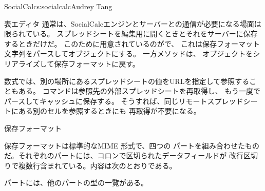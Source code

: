 \begin{aosachapter}{SocialCalc}{s:socialcalc}{Audrey Tang}
\begin{aosasect1}{表エディタ}
通常は、SocialCalcエンジンとサーバーとの通信が必要になる場面は限られている。
スプレッドシートを編集用に開くときとそれをサーバーに保存するときだけだ。
このために用意されているのがで、
これは保存フォーマット文字列をパースしてオブジェクトにする。
一方メソッドは、
オブジェクトをシリアライズして保存フォーマットに戻す。

数式では、別の場所にあるスプレッドシートの値をURLを指定して参照することもある。
コマンドは参照先の外部スプレッドシートを再取得し、
もう一度でパースしてキャッシュに保存する。
そうすれば、同じリモートスプレッドシートにある別のセルを参照するときにも
再取得が不要になる。

\end{aosasect1}

\begin{aosasect1}{保存フォーマット}

保存フォーマットは標準的なMIME 形式で、四つの
パートを組み合わせたものだ。それぞれのパートには、コロンで区切られたデータフィールドが
改行区切りで複数行含まれている。内容は次のとおりである。

\begin{aosaitemize}

  \item {}パートには、他のパートの型の一覧がある。


\end{aosaitemize}
\end{aosasect1}
\end{aosachapter}

